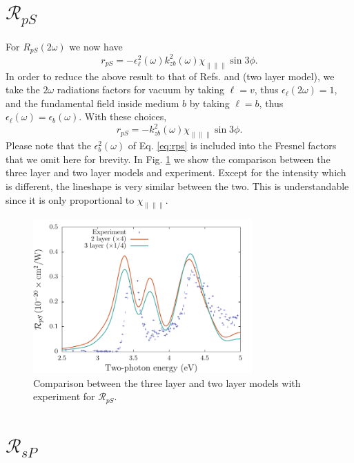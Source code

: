 \documentclass{article}
\begin{document}
\section{\texorpdfstring{$\mathcal{R}_{pS}$}{RpS}}

For $R_{pS}(2\omega)$ we now have
\begin{equation}\label{eq:rps}
r_{pS}
= -\epsilon^{2}_{\ell}(\omega)k^{2}_{zb}(\omega)
\chi_{\parallel\parallel\parallel}\sin3\phi.
\end{equation} 
In order to reduce the above result to that of Refs. \cite{sipePRB87} and
\cite{mizrahiJOSA88} (two layer model), we take the $2\omega$ radiations factors
for vacuum by taking $\ell=v$, thus $\epsilon_{\ell}(2\omega)=1$, and the
fundamental field inside medium $b$ by taking $\ell=b$, thus
$\epsilon_{\ell}(\omega)=\epsilon_{b}(\omega)$. With these choices,
\begin{equation*}
r_{pS} = -k^{2}_{zb}(\omega)\chi_{\parallel\parallel\parallel}\sin3\phi.
\end{equation*} 
Please note that the $\epsilon^{2}_{b}(\omega)$ of Eq. \eqref{eq:rps} is
included into the Fresnel factors that we omit here for brevity. In Fig.
\ref{rps} we show the comparison between the three layer and two layer models
and experiment. Except for the intensity which is different, the lineshape is
very similar between the two. This is understandable since it is only
proportional to $\chi_{\parallel\parallel\parallel}$.

\begin{figure}[t]
\centering
\includegraphics[width=0.75\textwidth]{figures/rps}
\caption{Comparison between the three layer and two layer models with
experiment for $\mathcal{R}_{pS}$.}
\label{rps}
\end{figure}

\section{\texorpdfstring{$\mathcal{R}_{sP}$}{RsP}}
\end{document}
